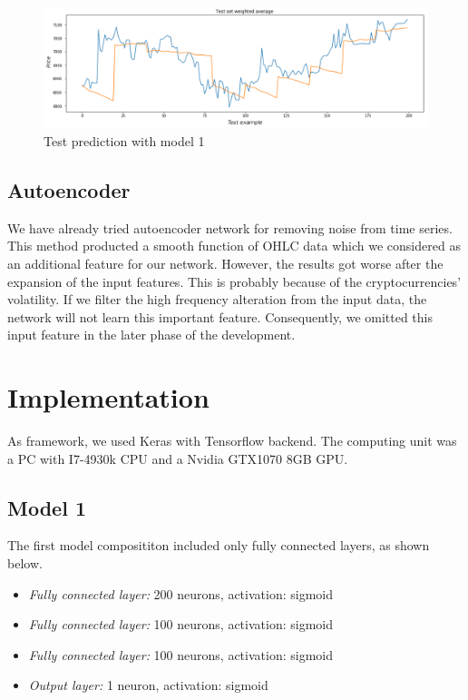 \documentclass[conference]{IEEEtran}
\begin{document}
\begin{figure}[!ht]
  \centering
  \includegraphics[width=170mm, keepaspectratio]{figures/test_pred_1.png}
  \caption{Test prediction with model 1}
  \label{fig:TestPred1}
\end{figure}

\subsection{Autoencoder}

We have already tried autoencoder network for removing noise from time series. This method producted a smooth function of OHLC data which we considered as an additional feature for our network. However, the results got worse after the expansion of the input features. This is probably because of the cryptocurrencies' volatility. If we filter the high frequency alteration from the input data, the network will not learn this important feature. Consequently, we omitted this input feature in the later phase of the development.

\section{Implementation}

As framework, we used Keras with Tensorflow backend. The computing unit was a PC with I7-4930k CPU and a Nvidia GTX1070 8GB GPU.

\subsection{Model 1}

The first model composititon included only fully connected layers, as shown below.

\vspace{3px}

\begin{itemize}
  \item \textit{Fully connected layer:} 200 neurons, activation: sigmoid
  \item \textit{Fully connected layer:} 100 neurons, activation: sigmoid
  \item \textit{Fully connected layer:} 100 neurons, activation: sigmoid
  \item \textit{Output layer:} 1 neuron, activation: sigmoid
\end{itemize}
\end{document}
